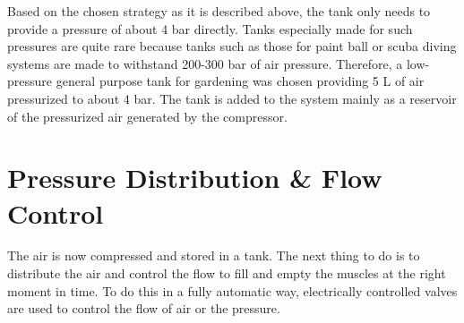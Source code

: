 \documentclass[main]{subfiles}
\begin{document}
Based on the chosen strategy as it is described above, the tank only needs to provide a pressure of about 4 bar directly. Tanks especially made for such pressures are quite rare because tanks such as those for paint ball or scuba diving systems are made to withstand 200-300 bar of air pressure. Therefore, a low-pressure general purpose tank for gardening was chosen providing 5 L of air pressurized to about 4 bar. The tank is added to the system mainly as a reservoir of the pressurized air generated by the compressor.

\begin{figure}[htp]
\centering
{}\hspace{0.1\textwidth}
\label{tank-compressor}
\end{figure}


\section{Pressure Distribution \& Flow Control}

The air is now compressed and stored in a tank. The next thing to do is to distribute the air and control the flow to fill and empty the muscles at the right moment in time. To do this in a fully automatic way, electrically controlled valves are used to control the flow of air or the pressure.

\end{document}
